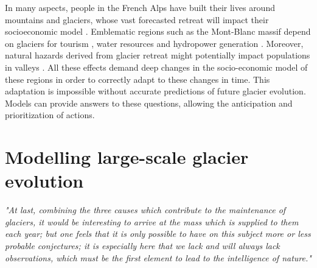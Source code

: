 In many aspects, people in the French Alps have built their lives around mountains and glaciers, whose vast forecasted retreat will impact their socioeconomic model \citep{mourey_evolution_2017, spandre_winter_2019}. Emblematic regions such as the Mont-Blanc massif depend on glaciers for tourism \citep{schut_sport_2013}, water resources and hydropower generation  \citep{laurent_impact_2020}. Moreover, natural hazards derived from glacier retreat might potentially impact populations in valleys \citep{magnin_estimating_2020}. All these effects demand deep changes in the socio-economic model of these regions in order to correctly adapt to these changes in time. This adaptation is impossible without accurate predictions of future glacier evolution. Models can provide answers to these questions, allowing the anticipation and prioritization of actions.

\section{Modelling large-scale glacier evolution}

\emph{"At last, combining the three causes which contribute to the maintenance of glaciers, it would be interesting to arrive at the mass which is supplied to them each year; but one feels that it is only possible to have on this subject more or less probable conjectures; it is especially here that we lack and will always lack observations, which must be the first element to lead to the intelligence of nature."}

